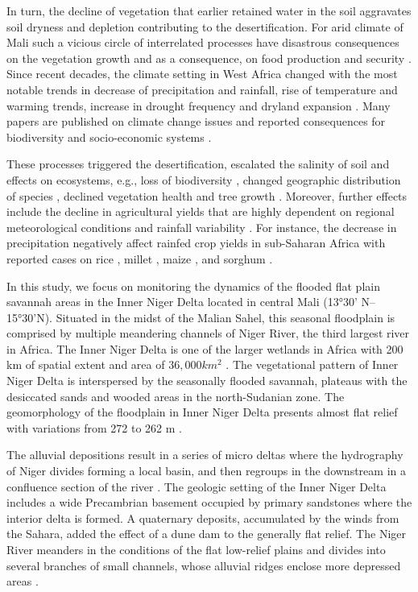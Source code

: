 \documentclass[12pt,a4paper,oneside]{article}
\def \newpar{\vspace{6pt}}
\begin{document}
\newpar In turn, the decline of vegetation that earlier retained water in the soil aggravates soil dryness and depletion contributing to the desertification. For arid climate of Mali such a vicious circle of interrelated processes have disastrous consequences on the vegetation growth and as a consequence, on food production and security \citep{Davies1996}. Since recent decades, the climate setting in West Africa changed with the most notable trends in decrease of precipitation and rainfall, rise of temperature and warming trends, increase in drought frequency and dryland expansion \citep{LEALFILHO202283,OGUNTUNDE2017121,OGUNTUNDE20061180,SIDIBE2019141}. Many papers are published on climate change issues and reported consequences for biodiversity and socio-economic systems \citep{LEHOUEROU1996133,Huang,Yu}. 

\newpar These processes triggered the desertification, escalated the salinity of soil and effects on ecosystems, e.g., loss of biodiversity \citep{HEUBES201348}, changed geographic distribution of species \citep{COULIBALY2023100359}, declined vegetation health and tree growth \citep{SANOGO2022100333}. Moreover, further effects include the
decline in agricultural yields that are highly dependent on regional meteorological conditions and rainfall variability \citep{Zare}. For instance, the decrease in precipitation negatively affect rainfed crop yields in sub-Saharan Africa \citep{RAES2021108563,BAMBIO2022102288} with reported cases on rice \citep{AKPOTI2022103429,ADJAH2022512}, millet \citep{BADO2022107992}, maize \citep{SRIVASTAVA201610}, and sorghum \citep{ADAM2020102920}.

\newpar In this study, we focus on monitoring the dynamics of the flooded flat plain savannah areas in the Inner Niger Delta located in central Mali (13°30' N--15°30'N). Situated in the midst of the Malian Sahel, this seasonal floodplain is comprised by multiple meandering channels of Niger River, the third largest river in Africa. The Inner Niger Delta is one of the larger wetlands in Africa with 200 km of spatial extent and area of $36,000 km^2$ \citep{KUPER200383}. The vegetational pattern of Inner Niger Delta is interspersed by the seasonally flooded savannah, plateaus with the desiccated sands and wooded areas in the north-Sudanian zone. The geomorphology of the floodplain in Inner Niger Delta presents almost flat relief with variations from 272 to 262 m \citep{Gallais2003}. 

\newpar The alluvial depositions result in a series of micro deltas where the hydrography of Niger divides forming a local basin, and then regroups in the downstream in a confluence section of the river \citep{dickens2018flows}. The geologic setting of the Inner Niger Delta includes a wide Precambrian basement occupied by primary sandstones where the interior delta is formed. A quaternary deposits, accumulated by the winds from the Sahara, added the effect of a dune dam to the generally flat relief. The Niger River meanders in the conditions of the flat low-relief plains and divides into several branches of small channels, whose alluvial ridges enclose more depressed areas \citep{Gourou}.
\end{document}
